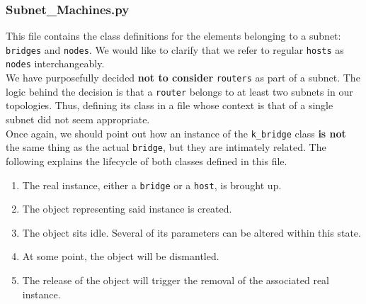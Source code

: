 \subsubsection{Subnet\_Machines.py}
    This file contains the class definitions for the elements belonging to a subnet: \texttt{bridges} and \texttt{nodes}. We would like to clarify that we refer to regular \texttt{hosts} as \texttt{nodes} interchangeably.\\

    We have purposefully decided \textbf{not to consider} \texttt{routers} as part of a subnet. The logic behind the decision is that a \texttt{router} belongs to at least two subnets in our topologies. Thus, defining its class in a file whose context is that of a single subnet did not seem appropriate.\\

    Once again, we should point out how an instance of the \texttt{k\_bridge} class \textbf{is not} the same thing as the actual \texttt{bridge}, but they are intimately related. The following explains the lifecycle of both classes defined in this file.\\

    \begin{enumerate}
        \item The real instance, either a \texttt{bridge} or a \texttt{host}, is brought up.
        \item The object representing said instance is created.
        \item The object sits idle. Several of its parameters can be altered within this state.
        \item At some point, the object will be dismantled.
        \item The release of the object will trigger the removal of the associated real instance.
    \end{enumerate}

